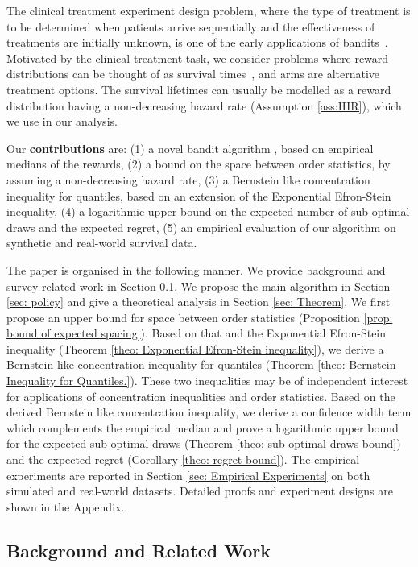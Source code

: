 The clinical treatment experiment design problem, where the type of treatment is to be determined when patients arrive sequentially and the effectiveness of treatments are initially unknown, is one of the early applications of bandits~\cite{thompson1933likelihood}.
Motivated by the clinical treatment task,
we consider problems where reward distributions can be thought of as
survival times~\cite{cox2018analysis}, and arms are alternative treatment options.
The survival lifetimes can usually be modelled as a reward distribution having a non-decreasing hazard rate (Assumption \ref{ass:IHR}), which we use in our analysis.

Our \textbf{contributions} are:
(1) a novel bandit algorithm \ourpolicy, based on empirical medians of the rewards,
(2) a bound on the space between order statistics, by assuming a non-decreasing hazard rate,
(3) a Bernstein like concentration inequality for quantiles, based on an extension of the Exponential Efron-Stein inequality,
(4) a logarithmic upper bound on the expected number of sub-optimal draws and the expected regret,
(5) an empirical evaluation of our algorithm on synthetic and real-world survival data.


The paper is organised in the following manner.
We provide background and survey related work in Section \ref{sec: Background}.
We propose the main algorithm in Section \ref{sec: policy} and give a theoretical analysis in Section \ref{sec: Theorem}.
We first propose an upper bound for space between order statistics (Proposition \ref{prop: bound of expected spacing}). Based on that and the Exponential Efron-Stein inequality (Theorem \ref{theo: Exponential Efron-Stein inequality}), we derive a Bernstein like concentration inequality for quantiles (Theorem \ref{theo: Bernstein Inequality for Quantiles.}). These two inequalities may be of independent interest for applications of concentration inequalities and order statistics.
Based on the derived Bernstein like concentration inequality, we derive a confidence width term which complements the empirical median and prove a logarithmic upper bound for the expected sub-optimal draws (Theorem \ref{theo: sub-optimal draws bound}) and the expected regret (Corollary \ref{theo: regret bound}).
The empirical experiments are reported in Section \ref{sec: Empirical Experiments} on both simulated and real-world datasets. Detailed proofs and experiment designs are shown in the Appendix.

\subsection{Background and Related Work}
\label{sec: Background}

